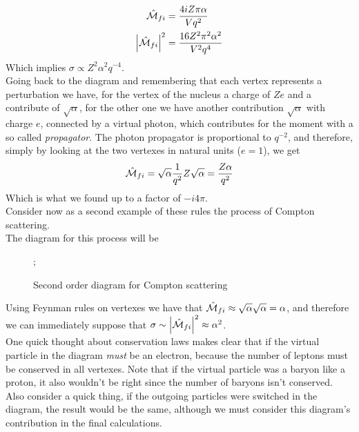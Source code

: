 \documentclass[../qm.tex]{subfiles}
\begin{document}
\begin{equation}
	\begin{aligned}
		\hat{\mathcal{M}}_{fi}&=\frac{4iZ\pi\alpha}{Vq^2}\\
		\abs{\hat{\mathcal{M}}_{fi}}^2&=\frac{16Z^2\pi^2\alpha^2}{V^2q^4}
	\end{aligned}
	\label{eq:transprobrutherfordfeyn}
\end{equation}
Which implies $\sigma\propto Z^2\alpha^2q^{-4}$.\\
Going back to the diagram and remembering that each vertex represents a perturbation we have, for the vertex of the nucleus a charge of $Ze$ and a contribute of $\sqrt{\alpha}$, for the other one we have another contribution $\sqrt{\alpha}$ with charge $e$, connected by a virtual photon, which contributes for the moment with a so called \emph{propagator}. The photon propagator is proportional to $q^{-2}$, and therefore, simply by looking at the two vertexes in natural units ($e=1$), we get
\begin{equation}
	\hat{\mathcal{M}}_{fi}=\sqrt{\alpha}\frac{1}{q^2}Z\sqrt{\alpha}=\frac{Z\alpha}{q^2}
	\label{eq:fromdiagramruth}
\end{equation}
Which is what we found up to a factor of $-i4\pi$.\\
Consider now as a second example of these rules the process of Compton scattering.\\
The diagram for this process will be
\begin{figure}[H]
	\centering
	;
	\caption{Second order diagram for Compton scattering}
	\label{fig:comptonscatfeynman}
\end{figure}
Using Feynman rules on vertexes we have that $\hat{\mathcal{M}}_{fi}\approx\sqrt{\alpha}\sqrt{\alpha}=\alpha$, and therefore we can immediately suppose that $\sigma\sim\abs{\hat{\mathcal{M}}_{fi}}^2\approx\alpha^2$.\\
One quick thought about conservation laws makes clear that if the virtual particle in the diagram \textit{must} be an electron, because the number of leptons must be conserved in all vertexes. Note that if the virtual particle was a baryon like a proton, it also wouldn't be right since the number of baryons isn't conserved.\\
Also consider a quick thing, if the outgoing particles were switched in the diagram, the result would be the same, although we must consider this diagram's contribution in the final calculations.\\
\end{document}
